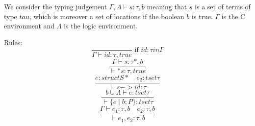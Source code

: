 We consider the typing judgement $\Gamma,\Lambda \vdash s : \tau,b$
meaning that $s$ is a set of terms of type $tau$, which is moreover a
set of locations if the boolean $b$ is true.
$\Gamma$ is the C environment and $\Lambda$ is the logic environment.

Rules:
\[
\frac{}{\Gamma \vdash id : \tau,true} \mbox{ if $id:\tau in \Gamma$}
\]
\[
\frac{\Gamma\vdash s:\tau*,b}{\vdash *s: \tau,true}
\]
\[
\frac{e: struct S* \quad e_2:tset \tau}{\vdash s->id : \tau}
\]
\[
\frac{b\cup \Lambda \vdash e: tset \tau}{\vdash \{ e \mid b ; P \} : tset \tau }
\]
\[
\frac{\Gamma\vdash e_1:\tau,b \quad e_2:\tau,b}{\vdash e_1,e_2: \tau,b}
\]

